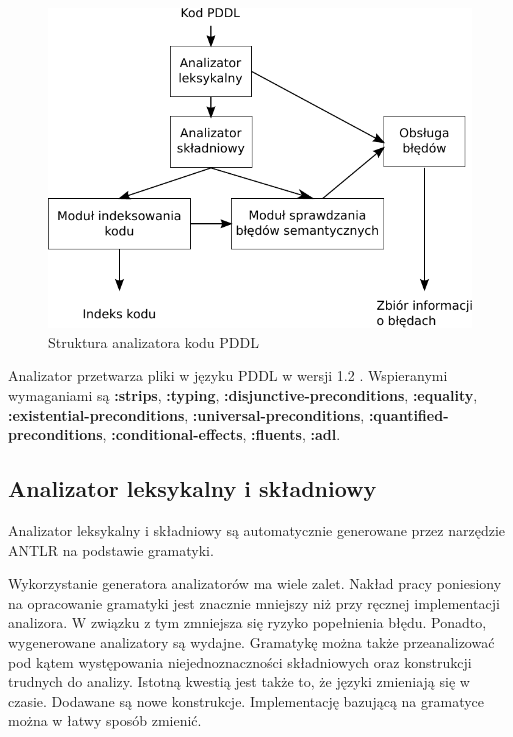 \begin{figure}[h]
  \centering
    \includegraphics{img/ana_structure.pdf}
    \caption{Struktura analizatora kodu PDDL}
    \label{ana_structure}
\end{figure}

\begin{sloppypar}
Analizator przetwarza pliki w języku PDDL w wersji 1.2 \cite{pddl}. Wspieranymi wymaganiami
są \textbf{:strips}, \textbf{:typing}, \textbf{:disjunctive-preconditions}, \textbf{:equality},
\textbf{:existential-preconditions}, \textbf{:universal-preconditions}, \textbf{:quantified-preconditions},
\textbf{:conditional-effects}, \textbf{:fluents}, \textbf{:adl}.
\end{sloppypar}

\subsection{Analizator leksykalny i składniowy}
Analizator leksykalny i składniowy są automatycznie generowane przez narzędzie ANTLR
na podstawie gramatyki. 

Wykorzystanie generatora analizatorów ma wiele zalet. Nakład pracy poniesiony na
opracowanie gramatyki jest znacznie mniejszy niż przy ręcznej implementacji analizora.
W związku z tym zmniejsza się ryzyko popełnienia błędu. Ponadto, wygenerowane analizatory są 
wydajne. Gramatykę można także przeanalizować pod kątem występowania niejednoznaczności
składniowych
oraz konstrukcji trudnych do analizy. Istotną kwestią jest także to, że
języki zmieniają się w czasie. Dodawane są nowe konstrukcje. %
Implementację bazującą na gramatyce można w łatwy sposób zmienić.

